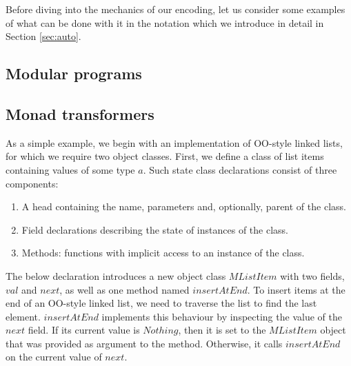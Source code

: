 Before diving into the mechanics of our encoding, let us consider some examples of what can be done with it in the notation which we introduce in detail in Section \ref{sec:auto}. %

\subsection{Modular programs}
\subsection{Monad transformers}



As a simple example, we begin with an implementation of OO-style linked lists, for which we require two object classes. First, we define a class of list items containing values of some type $a$. Such state class declarations consist of three components: 
\begin{enumerate}
    \item A head containing the name, parameters and, optionally, parent of the class.
    \item Field declarations describing the state of instances of the class.
    \item Methods: functions with implicit access to an instance of the class.
\end{enumerate}
The below declaration introduces a new object class $\mathit{MListItem}$ with two fields, $\mathit{val}$ and $\mathit{next}$, as well as one method named $\mathit{insertAtEnd}$. To insert items at the end of an OO-style linked list, we need to traverse the list to find the last element.  $\mathit{insertAtEnd}$ implements this behaviour by inspecting the value of the $\mathit{next}$ field. If its current value is $\mathit{Nothing}$, then it is set to the $\mathit{MListItem}$ object that was provided as argument to the method. Otherwise, it calls $\mathit{insertAtEnd}$ on the current value of $\mathit{next}$.
